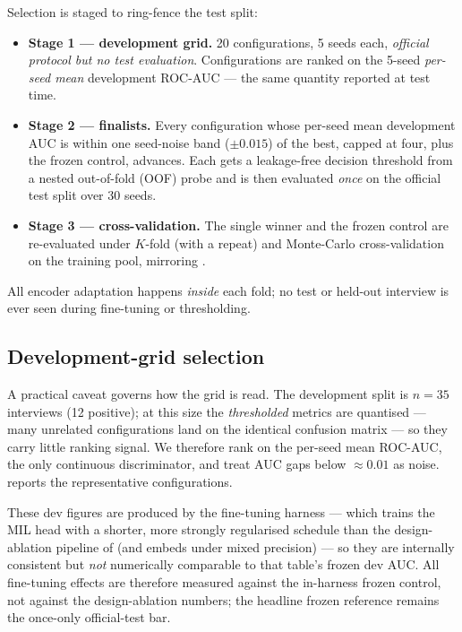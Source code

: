 Selection is staged to ring-fence the test split:
\begin{itemize}
  \item \textbf{Stage 1 --- development grid.} 20 configurations, 5 seeds each,
        \emph{official protocol but no test evaluation}. Configurations are ranked on the 5-seed
        \emph{per-seed mean} development ROC-AUC --- the same quantity reported
        at test time.
  \item \textbf{Stage 2 --- finalists.} Every configuration whose per-seed mean
        development AUC is within one seed-noise band ($\pm0.015$) of the best,
        capped at four, plus the frozen control, advances. Each gets a
        leakage-free decision threshold from a nested out-of-fold (OOF) probe and
        is then evaluated \emph{once} on the official test split over 30 seeds.
  \item \textbf{Stage 3 --- cross-validation.} The single winner and the frozen
        control are re-evaluated under $K$-fold (with a repeat) and
        Monte-Carlo cross-validation on the training pool, mirroring
        .
\end{itemize}
All encoder adaptation happens \emph{inside} each fold; no test or
held-out interview is ever seen during fine-tuning or thresholding.

\subsection{Development-grid selection}
\label{sec:finetune-iter1}

A practical caveat governs how the grid is read. The development split is
$n\!=\!35$ interviews (12 positive); at this size the \emph{thresholded} metrics
are quantised --- many unrelated configurations land on the identical confusion
matrix --- so they carry little ranking signal. We therefore rank on the
per-seed mean ROC-AUC, the only continuous discriminator, and treat AUC gaps
below $\approx\!0.01$ as noise.  reports the representative
configurations.

These dev figures are produced by the fine-tuning harness --- which trains the
MIL head with a shorter, more strongly regularised schedule than the
design-ablation pipeline of  (and embeds under mixed
precision) --- so they are internally consistent but \emph{not} numerically
comparable to that table's frozen dev AUC. All fine-tuning effects are therefore
measured against the in-harness frozen control, not against the design-ablation
numbers; the headline frozen reference remains the once-only official-test bar.

